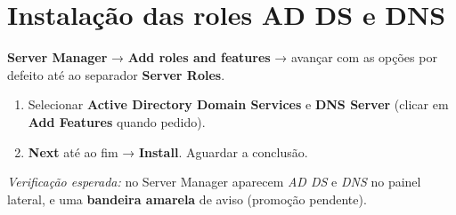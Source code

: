 
\section[Instalação das roles AD DS e DNS]{Instalação das roles AD DS e DNS}


\textbf{Server Manager} → \textbf{Add roles and features} → avançar com as opções por defeito até ao separador \textbf{Server Roles}.


\begin{enumerate}
\item Selecionar \textbf{Active Directory Domain Services} e \textbf{DNS Server} (clicar em \textbf{Add Features} quando pedido).
\item \textbf{Next} até ao fim → \textbf{Install}. Aguardar a conclusão.
\end{enumerate}

\emph{Verificação esperada:} no Server Manager aparecem \emph{AD DS} e \emph{DNS} no painel lateral, e uma \textbf{bandeira amarela} de aviso (promoção pendente).

